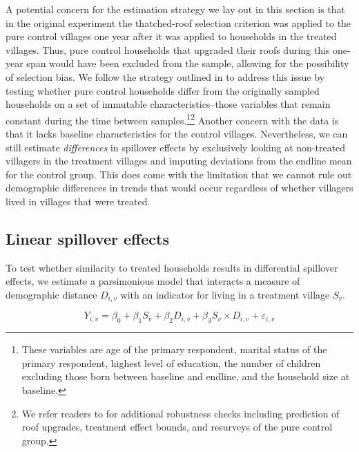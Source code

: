 \documentclass[11pt]{article}
\begin{document}
        A potential concern for the estimation strategy we lay out in this section is that in the original experiment the thatched-roof selection criterion was applied to the pure control villages one year after it was applied to households in the treated villages. Thus, pure control households that upgraded their roofs during this one-year span would have been excluded from the sample, allowing for the possibility of selection bias. We follow the strategy outlined in \textcite{haushofer_short-term_2016} to address this issue by testing whether pure control households differ from the originally sampled households on a set of immutable characteristics--those variables that remain constant during the time between samples.\footnote{These variables are age of the primary respondent, marital status of the primary respondent, highest level of education, the number of children excluding those born between baseline and endline, and the household size at baseline.}\footnote{We refer readers to \textcite{haushofer_short-term_2016} for additional robustness checks including prediction of roof upgrades, treatment effect bounds, and resurveys of the pure control group.} Another concern with the data is that it lacks baseline characteristics for the control villages. Nevertheless, we can still estimate \textit{differences} in spillover effects by exclusively looking at non-treated villagers in the treatment villages and imputing deviations from the endline mean for the control group. This does come with the limitation that we cannot rule out demographic differences in trends that would occur regardless of whether villagers lived in villages that were treated.

    \subsection{Linear spillover effects}

        To test whether similarity to treated households results in differential spillover effects, we estimate a parsimonious model that interacts a measure of demographic distance $D_{i,v}$ with an indicator for living in a treatment village $S_v$.

            \begin{equation} \label{eq:interaction}
            Y_{i,v} = \beta_0 + \beta_1 S_v + \beta_2 D_{i,v} + \beta_3 S_v \times  D_{i,v} + \varepsilon_{i,v}
            \end{equation}
\end{document}
